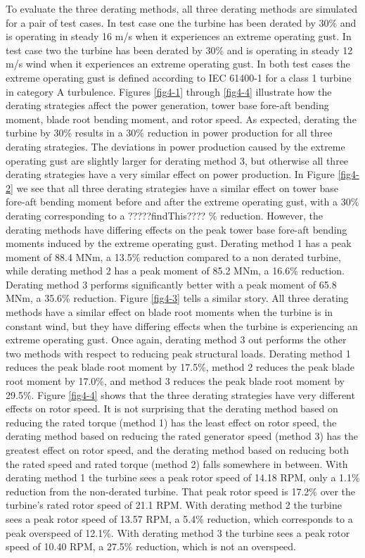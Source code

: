 To evaluate the three derating methods, all three derating methods are simulated for a pair of test cases. In test case one the turbine has been derated by 30\% and is operating in steady 16 m/s when it experiences an extreme operating gust. In test case two the turbine has been derated by 30\% and is operating in steady 12 m/s wind when it experiences an extreme operating gust. In both test cases the extreme operating gust is defined according to IEC 61400-1 \cite{IEC2005} for a class 1 turbine in category A turbulence. Figures \ref{fig4-1} through \ref{fig4-4} illustrate how the derating strategies affect the power generation, tower base fore-aft bending moment, blade root bending moment, and rotor speed. As expected, derating the turbine by 30\% results in a 30\% reduction in power production for all three derating strategies. The deviations in power production caused by the extreme operating gust are slightly larger for derating method 3, but otherwise all three derating strategies have a very similar effect on power production. In Figure \ref{fig4-2} we see that all three derating strategies have a similar effect on tower base fore-aft bending moment before and after the extreme operating gust, with a 30\% derating corresponding to a ?????findThis???? \% reduction. However, the derating methods have differing effects on the peak tower base fore-aft bending moments induced by the extreme operating gust. Derating method 1 has a peak moment of 88.4 MNm, a 13.5\% reduction compared to a non derated turbine, while derating method 2 has a peak moment of 85.2 MNm, a 16.6\% reduction. Derating method 3 performs significantly better with a peak moment of 65.8 MNm, a 35.6\% reduction. Figure \ref{fig4-3} tells a similar story. All three derating methods have a similar effect on blade root moments when the turbine is in constant wind, but they have differing effects when the turbine is experiencing an extreme operating gust. Once again, derating method 3 out performs the other two methods with respect to reducing peak structural loads. Derating method 1 reduces the peak blade root moment by 17.5\%, method 2 reduces the  peak blade root moment by 17.0\%, and method 3 reduces the peak blade root moment by 29.5\%. Figure \ref{fig4-4} shows that the three derating strategies have very different effects on rotor speed. It is not surprising that the derating method based on reducing the rated torque (method 1) has the least effect on rotor speed, the derating method based on reducing the rated generator speed (method 3) has the greatest effect on rotor speed, and the derating method based on reducing both the rated speed and rated torque (method 2) falls somewhere in between. With derating method 1 the turbine sees a peak rotor speed of 14.18 RPM, only a 1.1\% reduction from the non-derated turbine. That peak rotor speed is 17.2\% over the turbine's rated rotor speed of 21.1 RPM. With derating method 2 the turbine sees a peak rotor speed of 13.57 RPM, a 5.4\% reduction, which corresponds to a peak overspeed of 12.1\%. With derating method 3 the turbine sees a peak rotor speed of 10.40 RPM, a 27.5\% reduction, which is not an overspeed.


